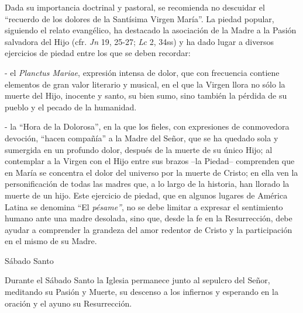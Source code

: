 			\begin{bodyintro}Dada su importancia doctrinal y pastoral, se recomienda no descuidar el “recuerdo de los dolores de la Santísima Virgen María”. La piedad popular, siguiendo el relato evangélico, ha destacado la asociación de la Madre a la Pasión salvadora del Hijo (cfr. \textit{Jn} 19, 25-27; \textit{Lc} 2, 34ss) y ha dado lugar a diversos ejercicios de piedad entre los que se deben recordar:\end{bodyintro}
			
			\begin{bodyintro}- el \textit{Planctus Mariae}, expresión intensa de dolor, que con frecuencia contiene elementos de gran valor literario y musical, en el que la Virgen llora no sólo la muerte del Hijo, inocente y santo, su bien sumo, sino también la pérdida de su pueblo y el pecado de la humanidad.\end{bodyintro}
			
			\begin{bodyintro}- la “Hora de la Dolorosa”, en la que los fieles, con expresiones de conmovedora devoción, “hacen compañía” a la Madre del Señor, que se ha quedado sola y sumergida en un profundo dolor, después de la muerte de su único Hijo; al contemplar a la Virgen con el Hijo entre sus brazos –la Piedad– comprenden que en María se concentra el dolor del universo por la muerte de Cristo; en ella ven la personificación de todas las madres que, a lo largo de la historia, han llorado la muerte de un hijo. Este ejercicio de piedad, que en algunos lugares de América Latina se denomina “El \textit{pésame”}, no se debe limitar a expresar el sentimiento humano ante una madre desolada, sino que, desde la fe en la Resurrección, debe ayudar a comprender la grandeza del amor redentor de Cristo y la participación en el mismo de su Madre.\end{bodyintro}
			
			\begin{bodyintro} \begin{introsubsection}Sábado Santo\end{introsubsection} \end{bodyintro}
			
			\begin{bodyintro}Durante el Sábado Santo la Iglesia permanece junto al sepulcro del Señor, meditando su Pasión y Muerte, su descenso a los infiernos y esperando en la oración y el ayuno su Resurrección.\end{bodyintro}
			
